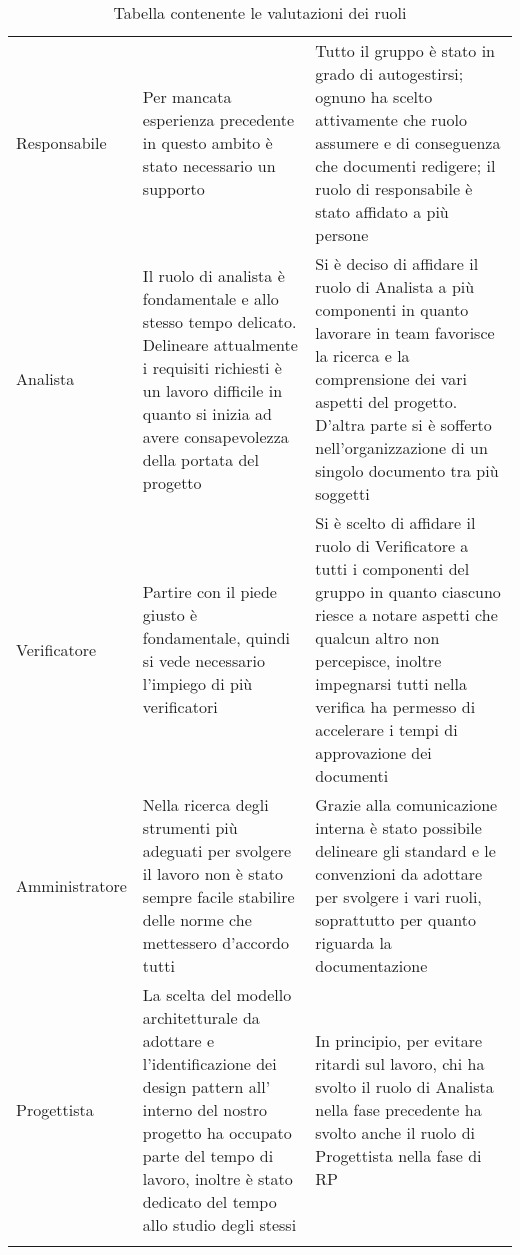 \documentclass[../piano_di_qualifica.tex]{subfiles}
\begin{document}
\begin{center}
\begin{longtable}{|p{2.5cm}|p{7cm}|p{7cm}|}
		Responsabile     & Per mancata esperienza precedente in questo ambito è stato necessario un supporto                                                                                                                                           & Tutto il gruppo è stato in grado di autogestirsi; ognuno ha scelto attivamente che ruolo assumere e di conseguenza che documenti redigere; il ruolo di responsabile è stato affidato a più persone                                                                    \\
		Analista         & Il ruolo di analista è fondamentale e allo stesso tempo delicato. Delineare attualmente i requisiti richiesti è un lavoro difficile in quanto si inizia ad avere consapevolezza della portata del progetto                  & Si è deciso di affidare il ruolo di Analista a più componenti in quanto lavorare in team favorisce la ricerca e la comprensione dei vari aspetti del progetto. D'altra parte si è sofferto nell'organizzazione di un singolo documento tra più soggetti               \\
		Verificatore     & Partire con il piede giusto è fondamentale, quindi si vede necessario l'impiego di più verificatori                                                                                                                         & Si è scelto di affidare il ruolo di Verificatore a tutti i componenti del gruppo in quanto ciascuno riesce a notare aspetti che qualcun altro non percepisce, inoltre impegnarsi tutti nella verifica ha permesso di accelerare i tempi di approvazione dei documenti \\
		Amministratore   & Nella ricerca degli strumenti più adeguati per svolgere il lavoro non è stato sempre facile stabilire delle norme che mettessero d'accordo tutti                                                                            & Grazie alla comunicazione interna è stato possibile delineare gli standard e le convenzioni da adottare per svolgere i vari ruoli, soprattutto per quanto riguarda la documentazione                                                                                  \\
		Progettista      & La scelta del modello architetturale da adottare e l'identificazione dei design pattern all' interno del nostro progetto ha occupato parte del tempo di lavoro, inoltre è stato dedicato del tempo allo studio degli stessi & In principio, per evitare ritardi sul lavoro, chi ha svolto il ruolo di Analista nella fase precedente ha svolto anche il ruolo di Progettista nella fase di RP                                                                                                       \\
		\hline
		\rowcolor{white}
		\caption{Tabella contenente le valutazioni dei ruoli}
	\end{longtable}
\end{center}
\end{document}
